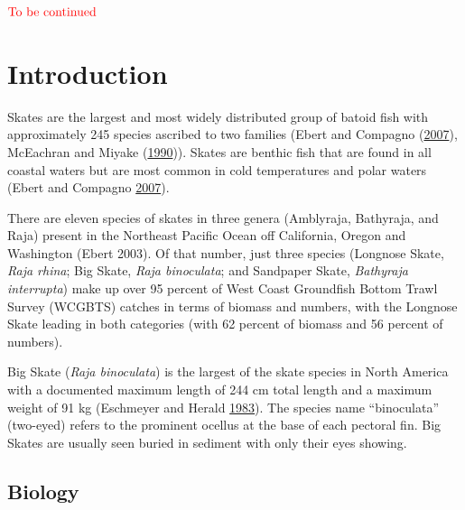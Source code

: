 \documentclass[12pt,]{article}
\begin{document}
\textbf{\(\color{red}{\text{To be continued}}\)}

\FloatBarrier

\newpage
\renewcommand{\thefigure}{\arabic{figure}}
\renewcommand{\thetable}{\arabic{table}}
\setcounter{figure}{0}
\setcounter{table}{0}

\newpage
\renewcommand{\thefigure}{\arabic{figure}}
\renewcommand{\thetable}{\arabic{table}}
\setcounter{figure}{0}
\setcounter{table}{0}

\hypertarget{introduction}{%
\section{Introduction}\label{introduction}}

Skates are the largest and most widely distributed group of batoid fish
with approximately 245 species ascribed to two families (Ebert and
Compagno (\protect\hyperlink{ref-Ebert2007}{2007}), McEachran and Miyake
(\protect\hyperlink{ref-McEachran1990}{1990})). Skates are benthic fish
that are found in all coastal waters but are most common in cold
temperatures and polar waters (Ebert and Compagno
\protect\hyperlink{ref-Ebert2007}{2007}).

There are eleven species of skates in three genera (Amblyraja,
Bathyraja, and Raja) present in the Northeast Pacific Ocean off
California, Oregon and Washington (Ebert 2003). Of that number, just
three species (Longnose Skate, \emph{Raja rhina}; Big Skate, \emph{Raja
binoculata}; and Sandpaper Skate, \emph{Bathyraja interrupta}) make up
over 95 percent of West Coast Groundfish Bottom Trawl Survey (WCGBTS)
catches in terms of biomass and numbers, with the Longnose Skate leading
in both categories (with 62 percent of biomass and 56 percent of
numbers).

Big Skate (\emph{Raja binoculata}) is the largest of the skate species
in North America with a documented maximum length of 244 cm total length
and a maximum weight of 91 kg (Eschmeyer and Herald
\protect\hyperlink{ref-Eschmeyer1983}{1983}). The species name
``binoculata'' (two-eyed) refers to the prominent ocellus at the base of
each pectoral fin. Big Skates are usually seen buried in sediment with
only their eyes showing.

\hypertarget{biology}{%
\subsection{Biology}\label{biology}}
\end{document}
